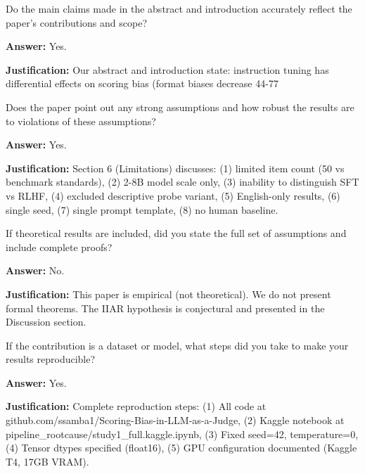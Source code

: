 
\begin{neurlipschecklist}

\item[{\textbf{1.:}}]
  Do the main claims made in the abstract and introduction accurately reflect the paper's contributions and scope?

  \textbf{Answer:} Yes.

  \textbf{Justification:} Our abstract and introduction state: instruction tuning has differential effects on scoring bias (format biases decrease 44-77%

\item[{\textbf{2.:}}]
  Does the paper point out any strong assumptions and how robust the results are to violations of these assumptions?

  \textbf{Answer:} Yes.

  \textbf{Justification:} Section 6 (Limitations) discusses: (1) limited item count (50 vs benchmark standards), (2) 2-8B model scale only, (3) inability to distinguish SFT vs RLHF, (4) excluded descriptive probe variant, (5) English-only results, (6) single seed, (7) single prompt template, (8) no human baseline.

\item[{\textbf{3.:}}]
  If theoretical results are included, did you state the full set of assumptions and include complete proofs?

  \textbf{Answer:} No.

  \textbf{Justification:} This paper is empirical (not theoretical). We do not present formal theorems. The IIAR hypothesis is conjectural and presented in the Discussion section.

\item[{\textbf{4.:}}]
  If the contribution is a dataset or model, what steps did you take to make your results reproducible?

  \textbf{Answer:} Yes.

  \textbf{Justification:} Complete reproduction steps: (1) All code at github.com/ssamba1/Scoring-Bias-in-LLM-as-a-Judge, (2) Kaggle notebook at pipeline_rootcause/study1_full.kaggle.ipynb, (3) Fixed seed=42, temperature=0, (4) Tensor dtypes specified (float16), (5) GPU configuration documented (Kaggle T4, 17GB VRAM).


\end{neurlipschecklist}
